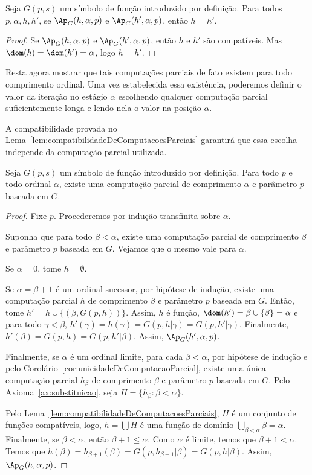 \begin{corollary}[$\BST$]\label{cor:unicidadeDeComputacaoParcial}
    Seja $G(p, s)$ um símbolo de função introduzido por definição.
    Para todos $p, \alpha, h, h'$, se $\Ap_G(h, \alpha, p)$ e $\Ap_G(h', \alpha, p)$, então $h=h'$.
\end{corollary}
\begin{proof}
    Se $\Ap_G(h, \alpha, p)$ e $\Ap_G(h', \alpha, p)$, então $h$ e $h'$ são compatíveis.
    Mas $\dom(h)=\dom(h')=\alpha$, logo $h=h'$.
\end{proof}
Resta agora mostrar que tais computações parciais de fato existem para todo comprimento ordinal.
Uma vez estabelecida essa existência, poderemos definir o valor da iteração no estágio $\alpha$ escolhendo qualquer computação parcial suficientemente longa e lendo nela o valor na posição $\alpha$.

A compatibilidade provada no Lema~\ref{lem:compatibilidadeDeComputacoesParciais} garantirá que essa escolha independe da computação parcial utilizada.
\begin{lemma}[$\ZFmPI$]\label{lem:existenciaDeComputacoesParciais}
    Seja $G(p, s)$ um símbolo de função introduzido por definição.
    Para todo $p$ e todo ordinal $\alpha$, existe uma computação parcial de comprimento $\alpha$ e parâmetro $p$ baseada em $G$.
\end{lemma}
\begin{proof}
    Fixe $p$.
    Procederemos por indução transfinita sobre $\alpha$.

    Suponha que para todo $\beta <\alpha$, existe uma computação parcial de comprimento $\beta$ e parâmetro $p$ baseada em $G$.
    Vejamos que o mesmo vale para $\alpha$.

    Se $\alpha=0$, tome $h=\emptyset$.

    Se $\alpha=\beta+1$ é um ordinal sucessor, por hipótese de indução, existe uma computação parcial $h$ de comprimento $\beta$ e parâmetro $p$ baseada em $G$.
    Então, tome $h'=h\cup\{(\beta, G(p, h))\}$.
    Assim, $h$ é função, $\dom(h')=\beta\cup\{\beta\}=\alpha$ e para todo $\gamma <\beta$, $h'(\gamma)=h(\gamma)=G(p, h|\gamma)=G(p, h'|\gamma)$.
    Finalmente, $h'(\beta)=G(p, h)=G(p, h'|\beta)$.
    Assim, $\Ap_G(h', \alpha, p)$.

    Finalmente, se $\alpha$ é um ordinal limite, para cada $\beta <\alpha$, por hipótese de indução e pelo Corolário~\ref{cor:unicidadeDeComputacaoParcial}, existe uma única computação parcial $h_\beta$ de comprimento $\beta$ e parâmetro $p$ baseada em $G$.
    Pelo Axioma~\ref{ax:substituicao}, seja $H=\{h_\beta : \beta <\alpha\}$.
    
    Pelo Lema~\ref{lem:compatibilidadeDeComputacoesParciais}, $H$ é um conjunto de funções compatíveis, logo, $h=\bigcup H$ é uma função de domínio $\bigcup_{\beta <\alpha} \beta=\alpha$.
    Finalmente, se $\beta <\alpha$, então $\beta+1\leq \alpha$.
    Como $\alpha$ é limite, temos que $\beta+1<\alpha$.
    Temos que $h(\beta)=h_{\beta+1}(\beta)=G(p, h_{\beta+1}|\beta)=G(p, h|\beta)$.
    Assim, $\Ap_G(h, \alpha, p)$.
\end{proof}

